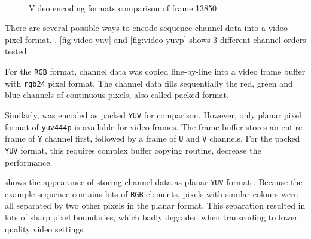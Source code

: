 \begin{figure}[t]
{  \label{fig:video-420}}\hfil
  \hfil
  \\
  \caption{\footnotesize Video encoding formats comparison of frame 13850}
  \label{fig:video-pix_fmt}
\end{figure}

There are several possible ways to encode sequence channel data into a video pixel format. , \ref{fig:video-yuv} and \ref{fig:video-yuvp} shows 3 different channel orders tested.

For the \texttt{RGB} format, channel data was copied line-by-line into a video frame buffer with \texttt{rgb24} pixel format. The channel data fills sequentially the red, green and blue channels of continuous pixels, also called packed format.

Similarly,  was encoded as packed \texttt{YUV} for comparison. However, only planar pixel format of \texttt{yuv444p} is available for video frames. The frame buffer stores an entire frame of \texttt{Y} channel first, followed by a frame of \texttt{U} and \texttt{V} channels. For the packed \texttt{YUV} format, this requires complex buffer copying routine,   decrease the performance.

 shows the appearance of storing channel data as planar \texttt{YUV} format . Because the example sequence contains lots of \texttt{RGB} elements, pixels with similar colours were all separated by two other pixels in the planar format. This separation resulted in lots of sharp pixel boundaries, which  badly degraded when transcoding to lower quality video settings.

